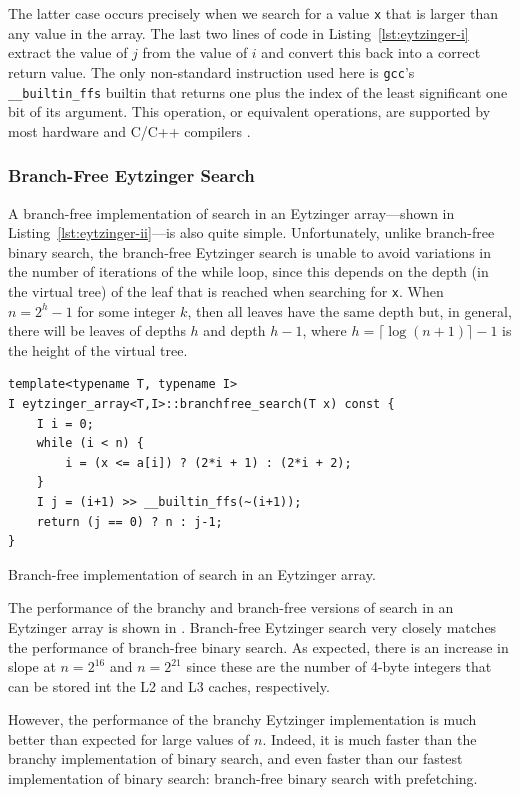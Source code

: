 \documentclass{patmorin}
\newcommand{\lstlabel}[1]{\label{lst:#1}}
\newcommand{\lstref}[1]{Listing~\ref{lst:#1}}
\begin{document}
The latter case occurs precisely when we search for a value
\texttt{x} that is larger than any value in the array. The
last two lines of code in \lstref{eytzinger-i} extract the value of $j$
from the value of $i$ and convert this back into a correct return value.
The only non-standard instruction used here is \texttt{gcc}'s
\texttt{__builtin_ffs} builtin that returns one plus the index
of the least significant one bit of its argument.  This operation,
or equivalent operations, are supported by most hardware and C/C++
compilers \cite{wiki:find}.

\subsubsection{Branch-Free Eytzinger Search}

A branch-free implementation of search in an Eytzinger array---shown
in \lstref{eytzinger-ii}---is also quite simple. Unfortunately, unlike
branch-free binary search, the branch-free Eytzinger search is unable
to avoid variations in the number of iterations of the while loop,
since this depends on the depth (in the virtual tree) of the leaf that
is reached when searching for \texttt{x}.  When $n=2^h-1$ for
some integer $k$, then all leaves have the same depth but, in general,
there will be leaves of depths $h$ and depth $h-1$, where $h=\lceil\log
(n+1)\rceil-1$ is the height of the virtual tree.

\begin{listing}
\begin{verbatim}
template<typename T, typename I>
I eytzinger_array<T,I>::branchfree_search(T x) const {
    I i = 0;
    while (i < n) {
        i = (x <= a[i]) ? (2*i + 1) : (2*i + 2);
    }
    I j = (i+1) >> __builtin_ffs(~(i+1));
    return (j == 0) ? n : j-1;
}
\end{verbatim}
\caption{Branch-free implementation of search in an Eytzinger array.}
\lstlabel{eytzinger-ii}
\end{listing}

The performance of the branchy and branch-free versions of search
in an Eytzinger array is shown in .  Branch-free
Eytzinger search very closely matches the performance of branch-free
binary search. As expected, there is an increase in slope at $n=2^{16}$
and $n=2^{21}$ since these are the number of 4-byte integers that can
be stored int the L2 and L3 caches, respectively.

However, the performance of the branchy Eytzinger implementation is
much better than expected for large values of $n$. Indeed, it is much
faster than the branchy implementation of binary search, and even
faster than our fastest implementation of binary search: branch-free binary
search with prefetching.
\end{document}
